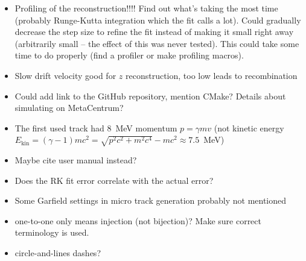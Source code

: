 {\begin{itemize}[topsep=4pt,itemsep=2pt]
				\item Profiling of the reconstruction!!!! Find out what's taking the most time (probably Runge-Kutta integration which the fit calls a lot). Could gradually decrease the step size to refine the fit instead of making it small right away (arbitrarily small -- the effect of this was never tested). This could take some time to do properly (find a profiler or make profiling macros).
				\item Slow drift velocity good for $z$ reconstruction, too low leads to recombination
				\item Could add link to the GitHub repository, mention CMake? Details about simulating on MetaCentrum?
				\item The first used track had 8~MeV momentum $p = \gamma m v$ (not kinetic energy $E_\text{kin} = (\gamma-1) m c^2 = \sqrt{p^2c^2+m^2c^4}-mc^2 \approx 7.5$~MeV)
				\item Maybe cite \garfieldpp user manual instead?
				\item Does the RK fit error correlate with the actual error?
				\item Some Garfield settings in micro track generation probably not mentioned
				\item one-to-one only means injection (not bijection)? Make sure correct terminology is used.
				\item circle-and-lines dashes?
			\end{itemize}
			}